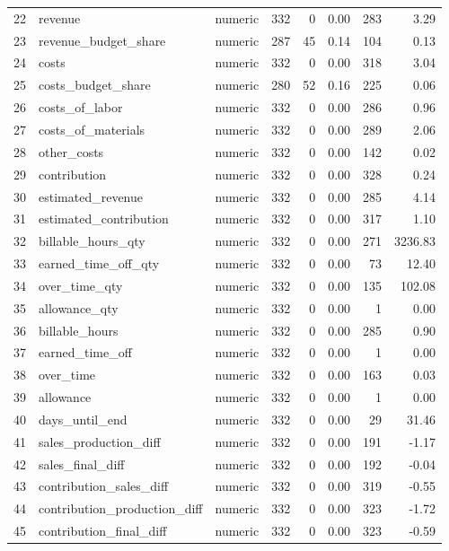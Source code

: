 \begin{sidewaystable}[ht]
\begin{tabular}{rllrrrrr}
  22 & revenue & numeric & 332 &   0 & 0.00 & 283 & 3.29 \\ 
  23 & revenue\_budget\_share & numeric & 287 &  45 & 0.14 & 104 & 0.13 \\ 
  24 & costs & numeric & 332 &   0 & 0.00 & 318 & 3.04 \\ 
  25 & costs\_budget\_share & numeric & 280 &  52 & 0.16 & 225 & 0.06 \\ 
  26 & costs\_of\_labor & numeric & 332 &   0 & 0.00 & 286 & 0.96 \\ 
  27 & costs\_of\_materials & numeric & 332 &   0 & 0.00 & 289 & 2.06 \\ 
  28 & other\_costs & numeric & 332 &   0 & 0.00 & 142 & 0.02 \\ 
  29 & contribution & numeric & 332 &   0 & 0.00 & 328 & 0.24 \\ 
  30 & estimated\_revenue & numeric & 332 &   0 & 0.00 & 285 & 4.14 \\ 
  31 & estimated\_contribution & numeric & 332 &   0 & 0.00 & 317 & 1.10 \\ 
  32 & billable\_hours\_qty & numeric & 332 &   0 & 0.00 & 271 & 3236.83 \\ 
  33 & earned\_time\_off\_qty & numeric & 332 &   0 & 0.00 &  73 & 12.40 \\ 
  34 & over\_time\_qty & numeric & 332 &   0 & 0.00 & 135 & 102.08 \\ 
  35 & allowance\_qty & numeric & 332 &   0 & 0.00 &   1 & 0.00 \\ 
  36 & billable\_hours & numeric & 332 &   0 & 0.00 & 285 & 0.90 \\ 
  37 & earned\_time\_off & numeric & 332 &   0 & 0.00 &   1 & 0.00 \\ 
  38 & over\_time & numeric & 332 &   0 & 0.00 & 163 & 0.03 \\ 
  39 & allowance & numeric & 332 &   0 & 0.00 &   1 & 0.00 \\ 
  40 & days\_until\_end & numeric & 332 &   0 & 0.00 &  29 & 31.46 \\ 
  41 & sales\_production\_diff & numeric & 332 &   0 & 0.00 & 191 & -1.17 \\ 
  42 & sales\_final\_diff & numeric & 332 &   0 & 0.00 & 192 & -0.04 \\ 
  43 & contribution\_sales\_diff & numeric & 332 &   0 & 0.00 & 319 & -0.55 \\ 
  44 & contribution\_production\_diff & numeric & 332 &   0 & 0.00 & 323 & -1.72 \\ 
  45 & contribution\_final\_diff & numeric & 332 &   0 & 0.00 & 323 & -0.59 \\ 

\end{tabular}
\end{sidewaystable}
